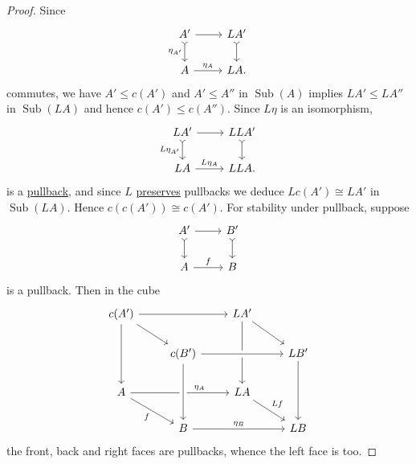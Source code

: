 \documentclass{article}
\DeclareMathOperator{\Sub}{Sub}
\begin{document}
\begin{proof}
  Since
  \begin{equation*}
  \begin{tikzcd}
    A' \rar \dar[tail,']{\eta_{A'}} & LA' \dar[tail] \\
    A \rar{\eta_A} & LA.
  \end{tikzcd}
  \end{equation*}
  commutes, we have $A' \leq c(A')$ and $A' \leq A''$ in \hyperlink{def:sub}{$\Sub(A)$} implies $LA' \leq LA''$ in $\Sub(LA)$ and hence $c(A') \leq c(A'')$.
  Since $L \eta$ is an isomorphism,
  \begin{equation*}
    \begin{tikzcd}
      LA' \rar \dar[tail,']{L\eta_{A'}} & LLA' \dar[tail] \\
      LA \rar{L\eta_A} & LLA.
    \end{tikzcd}
  \end{equation*}
  is a \hyperlink{def:pullback}{pullback}, and since $L$ \hyperlink{def:plim}{preserves} pullbacks we deduce $Lc(A') \cong LA'$ in $\Sub(LA)$.
  Hence $c(c(A')) \cong c(A')$.
  For stability under pullback, suppose
  \begin{equation*}
    \begin{tikzcd}
      A' \rar \dar[tail] & B' \dar[tail] \\ A \rar{f} & B
    \end{tikzcd}
  \end{equation*}
  is a pullback. Then in the cube
  \begin{equation*}
  \begin{tikzcd}
    c(A') \arrow[rr] \arrow[dd] \arrow[dr] && LA' \arrow[rd] \arrow[dd] \\
                                           & c(B') \arrow[rr, crossing over]  && LB' \arrow[dd] \\
    A \arrow[rr, "\eta_A", pos=0.7] \arrow[rd, "f"'] && LA \arrow[rd, "Lf"] \\
                                           & B \arrow[rr, "\eta_B"] \arrow[from=uu, crossing over] && LB
  \end{tikzcd}
  \end{equation*}
  the front, back and right faces are pullbacks, whence the left face is too.
\end{proof}
\end{document}
